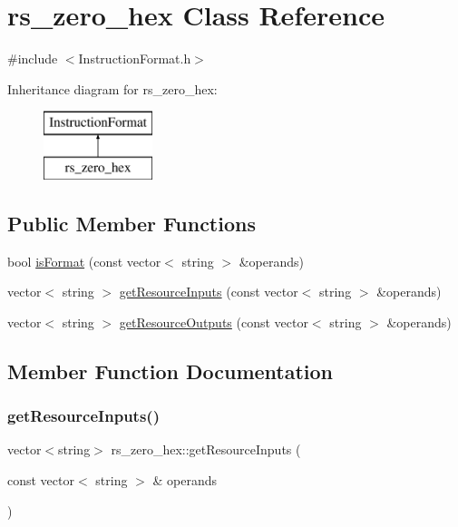 \hypertarget{classrs__zero__hex}{}\section{rs\+\_\+zero\+\_\+hex Class Reference}
\label{classrs__zero__hex}


{\ttfamily \#include $<$Instruction\+Format.\+h$>$}

Inheritance diagram for rs\+\_\+zero\+\_\+hex\+:\begin{figure}[H]
\begin{center}
\leavevmode
\includegraphics[height=2.000000cm]{classrs__zero__hex}
\end{center}
\end{figure}
\subsection*{Public Member Functions}
\begin{DoxyCompactItemize}
\item 
bool \hyperlink{classrs__zero__hex_ab1086f903e313eff8021b5edd83af9eb}{is\+Format} (const vector$<$ string $>$ \&operands)
\item 
vector$<$ string $>$ \hyperlink{classrs__zero__hex_a4a3e207656744266c6012e58cbab5de0}{get\+Resource\+Inputs} (const vector$<$ string $>$ \&operands)
\item 
vector$<$ string $>$ \hyperlink{classrs__zero__hex_ade4a0e0f8aa6fe706a2bc6059c56013e}{get\+Resource\+Outputs} (const vector$<$ string $>$ \&operands)
\end{DoxyCompactItemize}


\subsection{Member Function Documentation}
\mbox{\label{classrs__zero__hex_a4a3e207656744266c6012e58cbab5de0}} 
\subsubsection{\texorpdfstring{get\+Resource\+Inputs()}{getResourceInputs()}}
{\footnotesize\ttfamily vector$<$string$>$ rs\+\_\+zero\+\_\+hex\+::get\+Resource\+Inputs (\begin{DoxyParamCaption}\item[{const vector$<$ string $>$ \&}]{operands }\end{DoxyParamCaption})\hspace{0.3cm}{\ttfamily [virtual]}}

